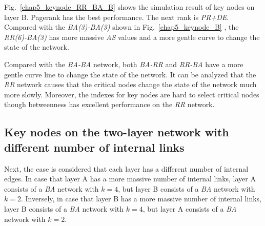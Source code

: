 Fig.~\ref{chap5_keynode_RR_BA_B} shows the simulation result of key nodes on layer B. Pagerank has the best performance. The next rank is \textit{PR+DE}.  Compared with the \textit{BA(3)-BA(3)} shown in Fig.~\ref{chap5_keynode_B} , the \textit{RR(6)-BA(3)} has more massive \textit{AS} values and a more gentle curve to change the state of the network. 

Compared with the \textit{BA-BA} network, both \textit{BA-RR} and \textit{RR-BA} have a more gentle curve line to change the state of the network. It can be analyzed that the \textit{RR} network causes that the critical nodes change the state of the network much more slowly. Moreover, the indexes for key nodes are hard to select critical nodes though betweenness has excellent performance on the \textit{RR} network.\\  

\subsection{Key nodes on the two-layer network with different number of internal links}
Next, the case is considered that each layer has a different number of internal edges. In case that layer A has a more massive number of internal links, layer A consists of a \textit{BA} network with $k=4$, but layer B consists of a \textit{BA} network with $k=2$. Inversely, in case that layer B has a more massive number of internal links, layer B consists of a \textit{BA} network with $k=4$, but layer A consists of a \textit{BA} network with $k=2$. 


